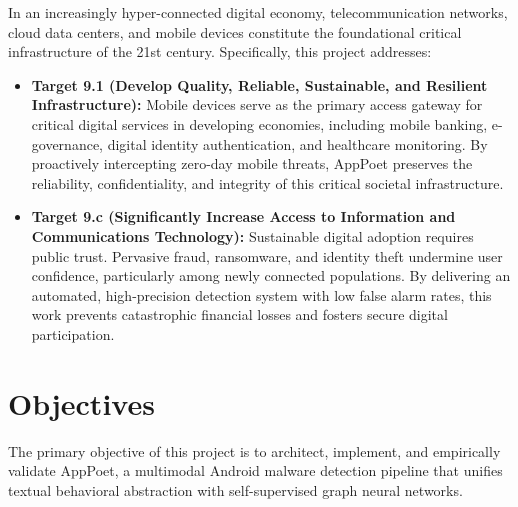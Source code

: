 \documentclass[12pt,a4paper,oneside]{report}
\begin{document}
In an increasingly hyper-connected digital economy, telecommunication networks, cloud data centers, and mobile devices constitute the foundational critical infrastructure of the 21st century. Specifically, this project addresses:
\begin{itemize}
    \item \textbf{Target 9.1 (Develop Quality, Reliable, Sustainable, and Resilient Infrastructure):} Mobile devices serve as the primary access gateway for critical digital services in developing economies, including mobile banking, e-governance, digital identity authentication, and healthcare monitoring. By proactively intercepting zero-day mobile threats, AppPoet preserves the reliability, confidentiality, and integrity of this critical societal infrastructure.
    \item \textbf{Target 9.c (Significantly Increase Access to Information and Communications Technology):} Sustainable digital adoption requires public trust. Pervasive fraud, ransomware, and identity theft undermine user confidence, particularly among newly connected populations. By delivering an automated, high-precision detection system with low false alarm rates, this work prevents catastrophic financial losses and fosters secure digital participation.
\end{itemize}

\section{Objectives}
The primary objective of this project is to architect, implement, and empirically validate AppPoet, a multimodal Android malware detection pipeline that unifies textual behavioral abstraction with self-supervised graph neural networks.
\end{document}
